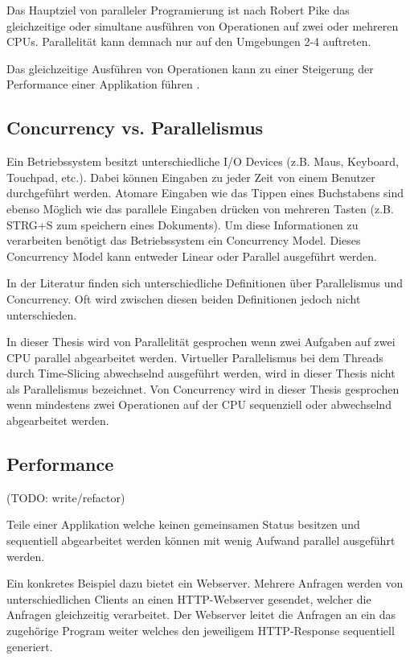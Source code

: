 Das Hauptziel von paralleler Programierung ist nach Robert Pike das gleichzeitige oder simultane ausführen von Operationen auf zwei oder mehreren CPUs.\cite[]{Pik2013} Parallelität kann demnach nur auf den Umgebungen 2-4 auftreten.

Das gleichzeitige Ausführen von Operationen kann zu einer Steigerung der Performance einer Applikation führen \cite[p. 18]{Can08}. 

\subsection{Concurrency vs. Parallelismus}

Ein Betriebssystem besitzt unterschiedliche I/O Devices (z.B. Maus, Keyboard, Touchpad, etc.). Dabei können Eingaben zu jeder Zeit von einem Benutzer durchgeführt werden. Atomare Eingaben wie das Tippen eines Buchstabens sind ebenso Möglich wie das parallele Eingaben drücken von mehreren Tasten (z.B. STRG+S zum speichern eines Dokuments). Um diese Informationen zu verarbeiten benötigt das Betriebssystem ein Concurrency Model. Dieses Concurrency Model kann entweder Linear oder Parallel ausgeführt werden. \cite[]{Pik2013}

In der Literatur finden sich unterschiedliche Definitionen über Parallelismus und Concurrency. Oft wird zwischen diesen beiden Definitionen jedoch nicht unterschieden.

In dieser Thesis wird von Parallelität gesprochen wenn zwei Aufgaben auf zwei CPU parallel abgearbeitet werden. Virtueller Parallelismus bei dem Threads durch Time-Slicing abwechselnd ausgeführt werden, wird in dieser Thesis nicht als Parallelismus bezeichnet. Von Concurrency wird in dieser Thesis gesprochen wenn mindestens zwei Operationen auf der CPU sequenziell oder abwechselnd abgearbeitet werden.


\subsection{Performance}
(TODO: write/refactor)

Teile einer Applikation welche keinen gemeinsamen Status besitzen und sequentiell abgearbeitet werden können mit wenig Aufwand parallel ausgeführt werden. \cite[p. 18]{Can08}

Ein konkretes Beispiel dazu bietet ein Webserver. Mehrere Anfragen werden von unterschiedlichen Clients an einen HTTP-Webserver gesendet, welcher die Anfragen gleichzeitig verarbeitet. Der Webserver leitet die Anfragen an ein das zugehörige Program weiter welches den jeweiligem HTTP-Response sequentiell generiert. \cite[p. 18]{Can08}

